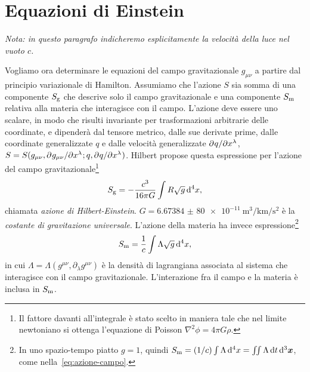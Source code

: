 \subsection{}
\label{sec:deviazione-geodetica}

\section{Equazioni di Einstein}
\label{sec:equazioni-einstein}

\emph{Nota: in questo paragrafo indicheremo esplicitamente la velocità della
  luce nel vuoto $c$.}

Vogliamo ora determinare le equazioni del campo gravitazionale $g_{\mu\nu}$ a
partire dal principio variazionale di Hamilton.  Assumiamo che l'azione $S$ sia
somma di una componente $S_{\textup{g}}$ che descrive solo il campo
gravitazionale e una componente $S_{\textup{m}}$ relativa alla materia che
interagisce con il campo.  L'azione deve essere uno scalare, in modo che risulti
invariante per trasformazioni arbitrarie delle coordinate, e dipenderà dal
tensore metrico, dalle sue derivate prime, dalle coordinate generalizzate $q$ e
dalle velocità generalizzate $\partial^{} q / \partial {x^{\lambda}}^{}$,
$S = S(g_{\mu\nu}, \partial^{} g_{\mu\nu} / \partial {x^{\lambda}}^{}; q,
\partial^{} q / \partial {x^{\lambda}}^{})$.
Hilbert propose questa espressione per l'azione del campo
gravitazionale\footnote{Il fattore davanti all'integrale è stato scelto in
  maniera tale che nel limite newtoniano si ottenga l'equazione di Poisson
  $\nabla^{2} \phi = 4\pi G\rho$.}
\begin{equation}
  S_{\textup{g}} = -\frac{c^{3}}{16\pi G} \int R \sqrt{g} \mathop{}\!\mathrm{d}^{4} x,
\end{equation}
chiamata  \emph{azione di Hilbert-Einstein}.
$G = \SI{6.673 84(80)e-11}{\cubic\metre\per\kilo\metre\per\second\squared}$ è la
\emph{costante di gravitazione universale}.  L'azione della materia ha invece
espressione\footnote{In uno spazio-tempo piatto $g = 1$, quindi
  $S_{\textup{m}} = (1/c)\int \Lambda \mathop{}\!\mathrm{d}^{4} x = \iint \Lambda \mathop{}\!\mathrm{d} t\mathop{}\!\mathrm{d}^{3}
  \bm{x}$, come nella~\eqref{eq:azione-campo}.}
\begin{equation}
  S_{\textup{m}} = \frac{1}{c} \int \Lambda \sqrt{g} \mathop{}\!\mathrm{d}^{4} x,
\end{equation}
in cui $\Lambda = \Lambda(g^{\mu\nu}, \partial_{\lambda}g^{\mu\nu})$ è la densità
di lagrangiana associata al sistema che interagisce con il campo
gravitazionale.  L'interazione fra il campo e la materia è inclusa in
$S_{\textup{m}}$.

